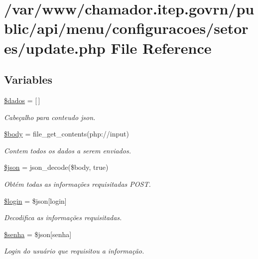 \hypertarget{setores_2update_8php}{}\section{/var/www/chamador.itep.\+govrn/public/api/menu/configuracoes/setores/update.php File Reference}
\label{setores_2update_8php}
\subsection*{Variables}
\begin{DoxyCompactItemize}
\item 
\hyperlink{setores_2update_8php_a252370d95039a38fa11afab784725d58}{\$dados} = \mbox{[}$\,$\mbox{]}
\begin{DoxyCompactList}\small\item\em Cabeçalho para conteudo json. \end{DoxyCompactList}\item 
\hyperlink{setores_2update_8php_a26b9f9373f7bb79dfcf8a86dff086b45}{\$body} = file\+\_\+get\+\_\+contents(\textquotesingle{}php\+://input\textquotesingle{})
\begin{DoxyCompactList}\small\item\em Contem todos os dados a serem enviados. \end{DoxyCompactList}\item 
\hyperlink{setores_2update_8php_acedd13b51401130848ce18f4d5c52605}{\$json} = json\+\_\+decode(\$body, true)
\begin{DoxyCompactList}\small\item\em Obtém todas as informações requisitadas P\+O\+ST. \end{DoxyCompactList}\item 
\hyperlink{setores_2update_8php_afc31993e855f9631572adfedcfe6f34b}{\$login} = \$json\mbox{[}\textquotesingle{}login\textquotesingle{}\mbox{]}
\begin{DoxyCompactList}\small\item\em Decodifica as informações requisitadas. \end{DoxyCompactList}\item 
\hyperlink{setores_2update_8php_a3678c8769c9698fd30581c1016c5f475}{\$senha} = \$json\mbox{[}\textquotesingle{}senha\textquotesingle{}\mbox{]}
\begin{DoxyCompactList}\small\item\em Login do usuário que requisitou a informação. \end{DoxyCompactList}\item 

\end{DoxyCompactItemize}
